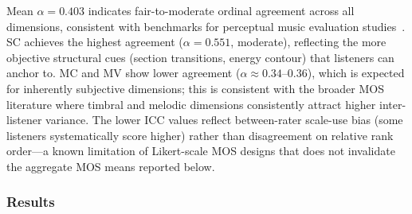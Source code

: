 \documentclass[conference]{IEEEtran}
\begin{document}
\begin{table}[ht]
\centering\small
\caption{Inter-rater reliability for the MOS study ($N=25$).
  $\alpha$: Krippendorff's ordinal alpha;
  $\kappa$: Fleiss' kappa; ICC: ICC(2,1).
  Benchmarks: $\alpha/\kappa\geq0.80$ strong, $\geq0.61$ moderate,
  $\geq0.41$ fair (Landis \& Koch 1977); ICC$\geq0.75$ good~\cite{koo2016guideline}.}
\label{tab:irr}
\end{table}

Mean $\alpha=0.403$ indicates fair-to-moderate ordinal agreement across all
dimensions, consistent with benchmarks for perceptual music evaluation
studies~\cite{sturm2014mml}.
SC achieves the highest agreement ($\alpha=0.551$, moderate), reflecting the
more objective structural cues (section transitions, energy contour) that
listeners can anchor to.
MC and MV show lower agreement ($\alpha\approx0.34$--$0.36$), which is
expected for inherently subjective dimensions; this is consistent with the
broader MOS literature where timbral and melodic dimensions
consistently attract higher inter-listener variance.
The lower ICC values reflect between-rater scale-use bias (some listeners
systematically score higher) rather than disagreement on
relative rank order---a known limitation of Likert-scale MOS designs
that does not invalidate the aggregate MOS means reported below.

\subsubsection*{Results}
\end{document}
